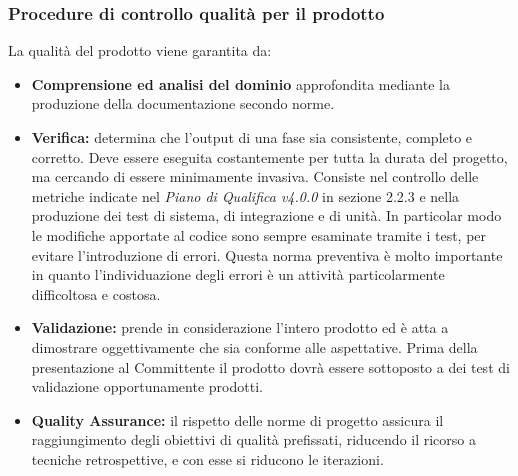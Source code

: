 \documentclass[a4paper]{article}
\begin{document}
		\subsubsection{Procedure di controllo qualità per il prodotto}
			La qualità del prodotto viene garantita da:
			\begin{itemize}
				\item \textbf{Comprensione ed analisi del dominio} approfondita mediante la produzione della documentazione 
				secondo norme.
				\item \textbf{Verifica:} determina che l'output di una fase sia consistente, completo e corretto. 
				Deve essere eseguita costantemente per tutta la durata del progetto, ma cercando di essere minimamente invasiva.
				Consiste nel controllo delle metriche indicate nel \emph{Piano di Qualifica v4.0.0} in sezione 2.2.3 e nella
				produzione dei test di sistema, di integrazione e di unità. In particolar modo le modifiche apportate al codice
				sono sempre esaminate tramite i test, per evitare l'introduzione di errori. Questa norma preventiva è molto
				importante in quanto l'individuazione degli errori è un attività particolarmente difficoltosa e costosa. 
				\item \textbf{Validazione:} prende in considerazione l'intero prodotto ed è atta a dimostrare oggettivamente che 
				sia conforme alle aspettative. Prima della presentazione al Committente il prodotto dovrà essere sottoposto a
				dei test di validazione opportunamente prodotti.
				\item \textbf{Quality Assurance:} il rispetto delle norme di progetto assicura il raggiungimento degli obiettivi 
				di qualità prefissati, riducendo il ricorso a tecniche retrospettive, e con esse si riducono le iterazioni.
			\end{itemize}
				
						
		
		
\end{document}
